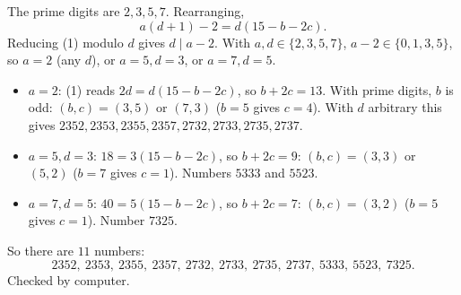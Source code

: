 The prime digits are $2,3,5,7$. Rearranging,
\[
a(d+1)-2=d(15-b-2c). \tag{1}
\]
Reducing (1) modulo $d$ gives $d\mid a-2$. With $a,d\in\{2,3,5,7\}$, $a-2\in\{0,1,3,5\}$, so $a=2$ (any $d$), or $a=5,d=3$, or $a=7,d=5$.
\begin{itemize}
\item $a=2$: (1) reads $2d=d(15-b-2c)$, so $b+2c=13$. With prime digits, $b$ is odd: $(b,c)=(3,5)$ or $(7,3)$ ($b=5$ gives $c=4$). With $d$ arbitrary this gives $2352,2353,2355,2357,2732,2733,2735,2737$.
\item $a=5,d=3$: $18=3(15-b-2c)$, so $b+2c=9$: $(b,c)=(3,3)$ or $(5,2)$ ($b=7$ gives $c=1$). Numbers $5333$ and $5523$.
\item $a=7,d=5$: $40=5(15-b-2c)$, so $b+2c=7$: $(b,c)=(3,2)$ ($b=5$ gives $c=1$). Number $7325$.
\end{itemize}
So there are $11$ numbers:
\[
\boxed{2352,\ 2353,\ 2355,\ 2357,\ 2732,\ 2733,\ 2735,\ 2737,\ 5333,\ 5523,\ 7325}.
\]
Checked by computer.
